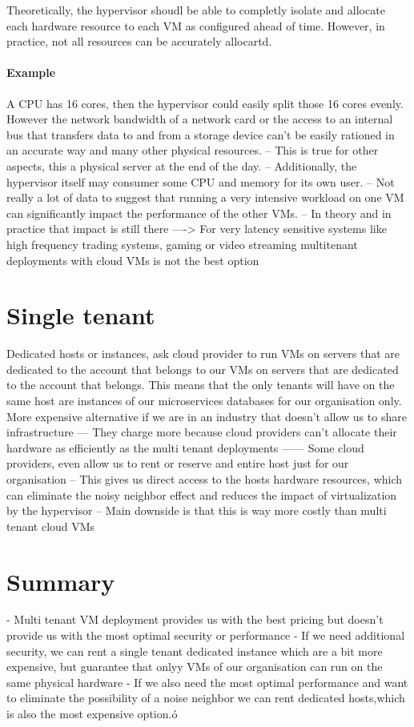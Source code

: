 \documentclass[a4paper, 11pt]{book}
\begin{document}
{    Theoretically, the hypervisor shoudl be able to completly isolate and allocate each hardware resource to each VM as configured ahead of time.
    However, in practice, not all resources can be accurately allocartd.

    \paragraph{Example}
    A CPU has 16 cores, then the hypervisor could easily split those 16 cores evenly.
    However the network bandwidth of a network card or the access to an internal bus that transfers data to and from a storage device can't be easily rationed in an accurate way and many other physical resources.
    -- This is true for other aspects, this a physical server at the end of the day.
    -- Additionally, the hypervisor itself may consumer some CPU and memory for its own user.
    -- Not really a lot of data to suggest that running a very intensive workload on one VM can significantly impact the performance of the other VMs.
    -- In theory and in practice that impact is still there
    ----> For very latency sensitive systems like high frequency trading systems, gaming or video streaming multitenant deployments with cloud VMs is not the best option


    \section{Single tenant}
    Dedicated hosts or instances, ask cloud provider to run VMs on servers that are dedicated to the account that belongs to our VMs on servers that are dedicated to the account that belongs.
    This means that the only tenants will have on the same host are instances of our microservices databases for our organisation only.
    More expensive alternative if we are in an industry that doesn't allow us to share infrastructure
    --- They charge more because cloud providers can't allocate their hardware as efficiently as the multi tenant deployments
    ------ Some cloud providers, even allow us to rent or reserve and entire host just for our organisation
    -- This gives us direct access to the hosts hardware resources, which can eliminate the noisy neighbor effect and reduces the impact of virtualization by the hypervisor
    -- Main downside is that this is way more costly than multi tenant cloud VMs


    \section{Summary}
    - Multi tenant VM deployment provides us with the best pricing but doesn't provide us with the most optimal security or performance
    - If we need additional security, we can rent a single tenant dedicated instance which are a bit more expensive, but guarantee that onlyy VMs of our organisation can run on the same physical hardware
    - If we also need the most optimal performance and want to eliminate the possibility of a noise neighbor we can rent dedicated hosts,which is also the most expensive option.ó

}
\end{document}
